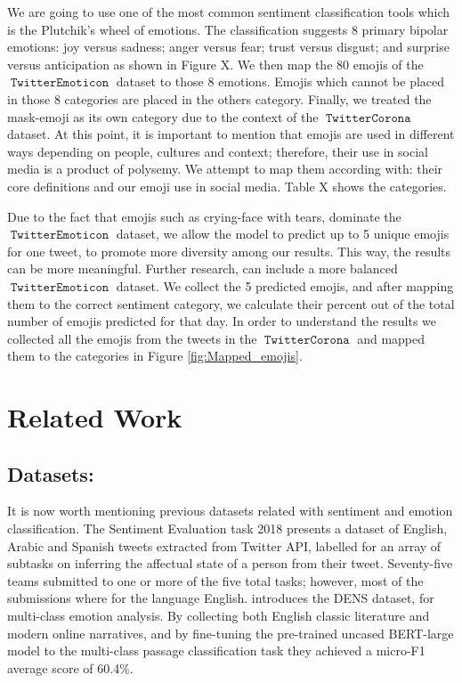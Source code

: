 \documentclass[11pt]{article}
\DeclareMathOperator{\emoticon}{\texttt{TwitterEmoticon}}
\DeclareMathOperator{\corona}{\texttt{TwitterCorona}}
\begin{document}
We are going to use one of the most common sentiment classification tools which is the Plutchik's wheel of emotions.
The classification \cite{} suggests 8 primary bipolar emotions: joy versus sadness; anger versus fear; trust versus disgust; 
and surprise versus anticipation as shown in Figure X. We then map the 80 emojis of the $\emoticon$ dataset
to those 8 emotions. Emojis which cannot be placed in those 8 categories are placed in the others category. 
Finally, we treated the mask-emoji as its own category due to the context of the $\corona$ dataset.
At this point, it is important to mention that emojis are used in different ways depending on people, cultures and context;
therefore, their use in social media is a product of polysemy. We attempt to map them according with: their core definitions and
our emoji use in social media. Table X shows the categories.  

Due to the fact that emojis such as crying-face with tears, dominate the $\emoticon$ dataset,
we allow the model to predict up to 5 unique emojis for one tweet, to promote more diversity among our results.
This way, the results can be more meaningful. Further research, can include a more balanced $\emoticon$ dataset.
We collect the 5 predicted emojis, and after mapping them to the correct sentiment category, we calculate their 
percent out of the total number of emojis predicted for that day. 
In order to understand the results we collected all the emojis from the tweets in the $\corona$ and mapped them to the categories in Figure \ref{fig:Mapped_emojis}.  


\section{Related Work}
\label{sec:related}
\subsection{Datasets:}
It is now worth mentioning previous datasets related with sentiment and emotion classification. The Sentiment Evaluation task 2018 \cite{mohammad-etal-2018-semeval} presents a dataset of English, Arabic and Spanish tweets extracted from Twitter API, labelled for an array of subtasks on inferring the affectual state of a person from their tweet. Seventy-five teams submitted to one or more of the five total tasks; however, most of the submissions where for the language English. 
\cite{liu2019dens} introduces the DENS dataset, for multi-class emotion analysis. By collecting both English classic literature and modern online narratives, and by fine-tuning the pre-trained uncased BERT-large model to the multi-class passage classification task they achieved a micro-F1 average score of 60.4\%.
\end{document}
